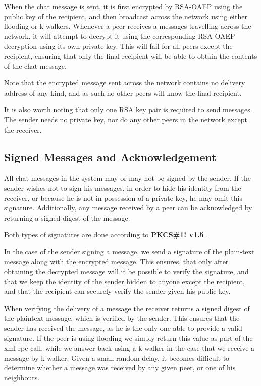 When the chat message is sent, it is first encrypted by RSA-OAEP using the public key of the recipient, and then broadcast across the network using either flooding or k-walkers. Whenever a peer receives a messages travelling across the network, it will attempt to decrypt it using the corresponding RSA-OAEP decryption using its own private key. This will fail for all peers except the recipient, ensuring that only the final recipient will be able to obtain the contents of the chat message.

Note that the encrypted message sent across the network contains no delivery address of any kind, and as such no other peers will know the final recipient.

It is also worth noting that only one RSA key pair is required to send messages. The sender needs no private key, nor do any other peers in the network except the receiver.

\subsection{Signed Messages and Acknowledgement}

All chat messages in the system may or may not be signed by the sender. If the sender wishes not to sign his messages, in order to hide his identity from the receiver, or because he is not in possession of a private key, he may omit this signature. Additionally, any message received by a peer can be acknowledged by returning a signed digest of the message.

Both types of signatures are done according to \textbf{PKCS\#1! v1.5} \citep{PKCS}.

In the case of the sender signing a message, we send a signature of the plain-text message along with the encrypted message. This ensures, that only after obtaining the decrypted message will it be possible to verify the signature, and that we keep the identity of the sender hidden to anyone except the recipient, and that the recipient can securely verify the sender given his public key.

When verifying the delivery of a message the receiver returns a signed digest of the plaintext message, which is verified by the sender. This ensures that the sender has received the message, as he is the only one able to provide a valid signature. If the peer is using flooding we simply return this value as part of the xml-rpc call, while we answer back using a k-walker in the case that we receive a message by k-walker. Given a small random delay, it becomes difficult to determine whether a message was received by any given peer, or one of his neighbours. 

